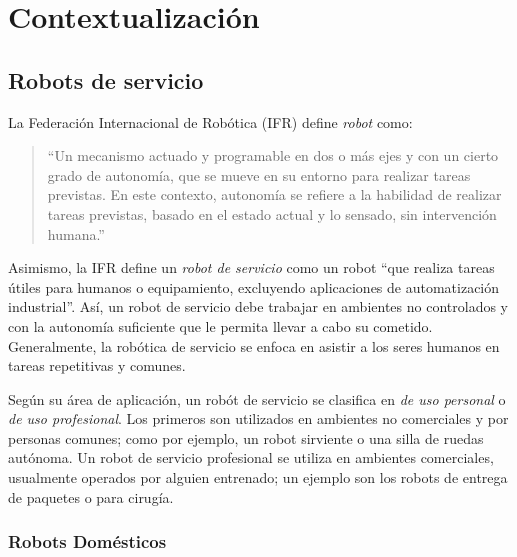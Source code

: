 
\chapter{Contextualizaci\'on}



\section{Robots de servicio}

La Federaci\'on Internacional de Rob\'otica (IFR)\cite{IFR} define \textit{robot} como:
\begin{quotation}
``Un mecanismo actuado y programable en dos o m\'as ejes y con un cierto grado de autonom\'ia, que se mueve en su entorno para realizar tareas previstas. En este contexto, autonom\'ia se refiere a la habilidad de realizar tareas previstas, basado en el estado actual y lo sensado, sin intervenci\'on humana.''
\end{quotation}

Asimismo, la IFR define un \textit{robot de servicio} como un robot ``que realiza tareas \'utiles para humanos o equipamiento, excluyendo aplicaciones de automatizaci\'on industrial''. As\'i, un robot de servicio debe trabajar en ambientes no controlados y con la autonom\'ia suficiente que le permita llevar a cabo su cometido. Generalmente, la rob\'otica de servicio se enfoca en asistir a los seres humanos en tareas repetitivas y comunes.

Seg\'un su \'area de aplicaci\'on, un rob\'ot de servicio se clasifica en \textit{de uso personal} o \textit{de uso profesional}. Los primeros son utilizados en ambientes no comerciales y por personas comunes; como por ejemplo, un robot sirviente o una silla de ruedas aut\'onoma. Un robot de servicio profesional se utiliza en ambientes comerciales, usualmente operados por alguien entrenado; un ejemplo son los robots de entrega de paquetes o para cirug\'ia.


\subsection{Robots Dom\'esticos}\label{sec:domestic_robots}

